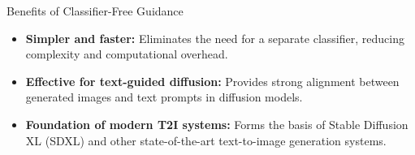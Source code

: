 \begin{frame}{Benefits of Classifier-Free Guidance}
    \begin{itemize}
        \item \textbf{Simpler and faster:} Eliminates the need for a separate classifier, reducing complexity and computational overhead.
        \item \textbf{Effective for text-guided diffusion:} Provides strong alignment between generated images and text prompts in diffusion models.
        \item \textbf{Foundation of modern T2I systems:} Forms the basis of Stable Diffusion XL (SDXL) and other state-of-the-art text-to-image generation systems.
    \end{itemize}
\end{frame}